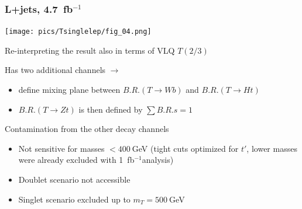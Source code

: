 \documentclass[xcolor=dvipsnames,10pt]{beamer}
\newcommand{\ifb}{~fb$^{-1}$}
\begin{document}
\begin{frame}\frametitle{L+jets, 4.7~fb$^{-1}$~\cite{ATLAS:2012qe}}%
\footnotesize\centering

\begin{minipage}{.6\textwidth}
\centering

\texttt{[image: pics/Tsinglelep/fig\_04.png]}

\end{minipage}\begin{minipage}{.4\textwidth}
\centering

Re-interpreting the result also in terms of VLQ $T(2/3)$

\scriptsize

Has \alert{two additional channels} $\rightarrow$\\

\begin{itemize}
\item define mixing plane between $B.R.(T\rightarrow Wb)$ and $B.R.(T\rightarrow Ht)$\\
\item $B.R.(T\rightarrow Zt)$ is then 
defined by $\sum B.R.s = 1$
\end{itemize}

\vspace{\baselineskip}

Contamination from the other decay channels

\begin{itemize}
\item Not sensitive for masses $<400~$GeV (tight cuts optimized for $t'$, lower masses were already excluded with 1\ifb analysis)
\item Doublet scenario not accessible
\item Singlet scenario excluded up to $m_T = 500~$GeV
\end{itemize}


\end{minipage}

\end{frame}
\end{document}
